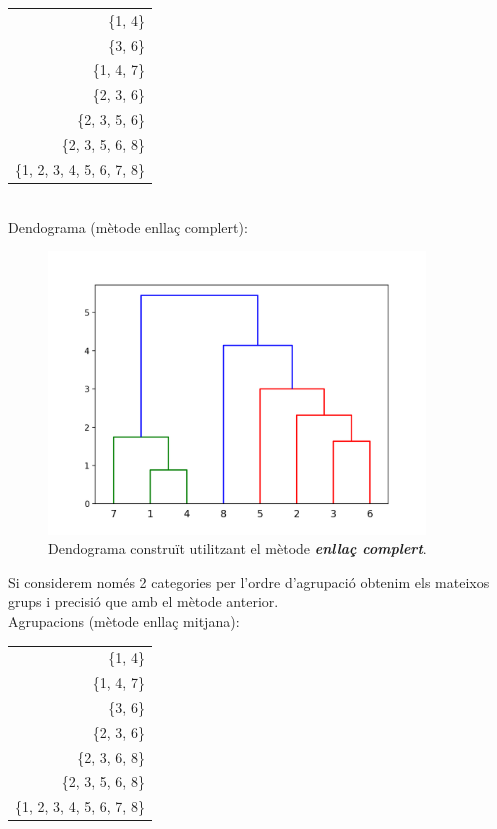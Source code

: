\documentclass{article} %
\begin{document}
{	{\selectfont\small
	\begin{tabular}{r}
		\{1, 4\} \\
		\{3, 6\} \\
		\{1, 4, 7\} \\
		\{2, 3, 6\} \\
		\{2, 3, 5, 6\} \\
        \{2, 3, 5, 6, 8\} \\
 		\{1, 2, 3, 4, 5, 6, 7, 8\} \\
	\end{tabular}
	} \\

	Dendograma (mètode enllaç complert):

	\begin{figure}[H]
		\includegraphics[width=10cm]{complete}
		\centering
		\color{blue}
		\caption{Dendograma construït utilitzant el mètode \textbf{\textit{enllaç complert}}.}\label{visina8}
	\end{figure}

	Si considerem només 2 categories per l'ordre d'agrupació obtenim els mateixos grups i precisió que amb el mètode anterior. \\


	Agrupacions (mètode enllaç mitjana): 

	{\selectfont\small
	\begin{tabular}{r}
		\{1, 4\} \\
		\{1, 4, 7\} \\
		\{3, 6\} \\
		\{2, 3, 6\} \\
		\{2, 3, 6, 8\} \\
        \{2, 3, 5, 6, 8\} \\
 		\{1, 2, 3, 4, 5, 6, 7, 8\} \\
	\end{tabular}
	} \\

}
\end{document}
